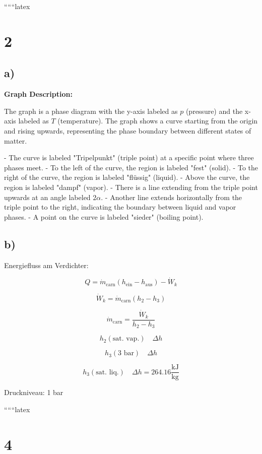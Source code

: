 
``````latex


\section*{2}

\subsection*{a)}

\textbf{Graph Description:}

The graph is a phase diagram with the y-axis labeled as $p$ (pressure) and the x-axis labeled as $T$ (temperature). The graph shows a curve starting from the origin and rising upwards, representing the phase boundary between different states of matter. 

- The curve is labeled "Tripelpunkt" (triple point) at a specific point where three phases meet.
- To the left of the curve, the region is labeled "fest" (solid).
- To the right of the curve, the region is labeled "flüssig" (liquid).
- Above the curve, the region is labeled "dampf" (vapor).
- There is a line extending from the triple point upwards at an angle labeled $2\alpha$.
- Another line extends horizontally from the triple point to the right, indicating the boundary between liquid and vapor phases.
- A point on the curve is labeled "sieder" (boiling point).

\subsection*{b)}

Energiefluss am Verdichter:

\[
Q = \dot{m}_{\text{carn}} (h_{\text{ein}} - h_{\text{aus}}) - \dot{W}_k
\]

\[
\dot{W}_k = \dot{m}_{\text{carn}} (h_2 - h_3)
\]

\[
\dot{m}_{\text{carn}} = \frac{\dot{W}_k}{h_2 - h_3}
\]

\[
h_2 (\text{sat. vap.}) \quad \Delta h
\]

\[
h_3 (\text{3 bar}) \quad \Delta h
\]

\[
h_3 (\text{sat. liq.}) \quad \Delta h = 264.16 \frac{\text{kJ}}{\text{kg}}
\]

Druckniveau: 1 bar

``````latex


\section*{4}

